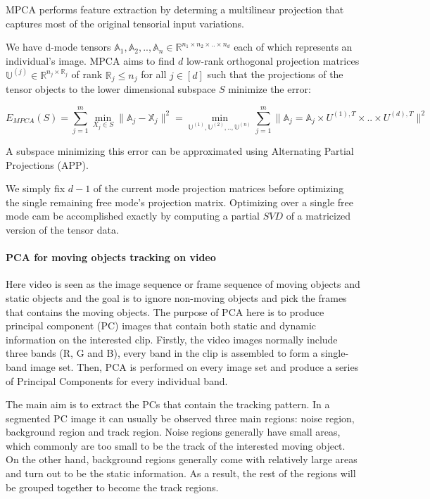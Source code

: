 \documentclass[a4paper,12pt]{article}
\begin{document}
MPCA performs feature extraction by determing a multilinear projection that captures most of the original tensorial input variations.

We have d-mode tensors $\mathbb{A}_1,\mathbb{A}_2, .., \mathbb{A}_n \in \mathbb{R}^{n_1 \times n_2 \times .. \times n_d}$ each of which represents an individual's image. MPCA aims to find $d$ low-rank orthogonal projection matrices $
\mathbb{U}^{(j)} \in \mathbb{R}^{n_j \times \mathbb{R}_j}$ of rank $\mathbb{R}_j \leq n_j$ for all $j \in [d]$  such that the projections of the tensor objects to the lower dimensional subspace $S$ minimize the error:

$$E_{MPCA} (S) = \sum_{j = 1}^{m} \min_{X_j \in S} \| \mathbb{A}_j - \mathbb{X}_j \|^2 = \min_{\mathbb{U}^{(1)}, \mathbb{U}^{(2)},..,\mathbb{U}^{(n)}} \sum_{j = 1}^{m} \|\mathbb{A}_j = \mathbb{A}_j \times U^{(1),T} \times .. \times U^{(d),T} \|^2$$

A subspace minimizing this error can be approximated using Alternating Partial Projections (APP).

We simply fix $d-1$ of the current mode projection matrices before optimizing the single remaining free mode's projection matrix. Optimizing over a single free mode cam be accomplished exactly by computing a partial $SVD$ of a matricized version of the tensor data.

\paragraph{PCA for moving objects tracking on video}

Here video is seen as the image sequence or frame sequence of moving objects and static objects and the goal is to ignore non-moving objects and pick the frames that contains the moving objects. The purpose of PCA here is to produce principal component (PC) images that contain both static and dynamic information on the interested clip. Firstly, the video images normally include three bands (R, G and B), every band in the clip is assembled to form a single-band image set. Then, PCA is performed on every image set and produce a series of Principal Components for every individual band. 

The main aim is to extract the PCs that contain the tracking pattern. In a segmented PC image it can usually be observed three main regions: noise region, background region and track region. Noise regions generally have small areas, which commonly are too small to be the track of the interested moving object. On the other hand, background regions generally come with relatively large areas and turn out to be the static information. As a result, the rest of the regions will be grouped together to become the track regions. 
\end{document}
